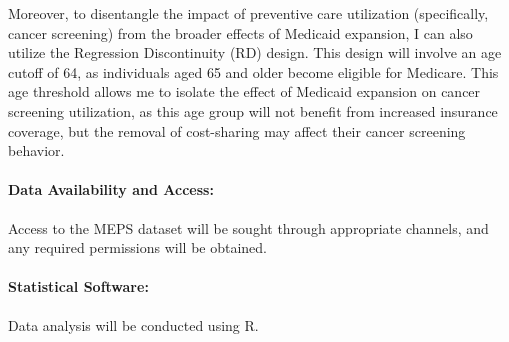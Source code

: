 \documentclass[man]{apa7}
\begin{document}
Moreover, to disentangle the impact of preventive care utilization (specifically, cancer screening) from the broader effects of Medicaid expansion, I can also utilize the Regression Discontinuity (RD) design. This design will involve an age cutoff of 64, as individuals aged 65 and older become eligible for Medicare. This age threshold allows me to isolate the effect of Medicaid expansion on cancer screening utilization, as this age group will not benefit from increased insurance coverage, but the removal of cost-sharing may affect their cancer screening behavior.

\paragraph{Data Availability and Access:} Access to the MEPS dataset will be sought through appropriate channels, and any required permissions will be obtained.

\paragraph{Statistical Software:} Data analysis will be conducted using R.

\newpage

\printbibliography

% 
\end{document}
